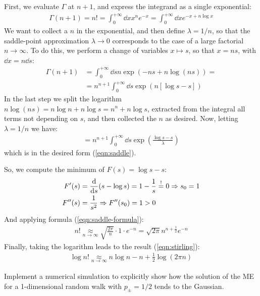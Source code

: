 \documentclass[../template.tex]{subfiles}
\begin{document}
\begin{exo}
    First, we evaluate $\Gamma$ at $n+1$, and express the integrand as a single exponential:
    \begin{align*}
        \Gamma(n+1) = n! = \int_0^{+\infty} \dd{x} x^n e^{-x}  = \int_{0}^{+\infty} \dd{x} e^{-x + n \log x} 
    \end{align*}
    We want to collect a $n$ in the exponential, and then define $\lambda = 1/n$, so that the saddle-point approximation $\lambda \to 0$ corresponds to the case of a large factorial $n \to \infty$. To do this, we perform a change of variables $x \mapsto s$, so that $x = n s$, with $\dd{x} = n \dd{s}$:
    \begin{align*}
        \Gamma(n+1) &= \int_0^{+\infty} \dd{s} n \exp(-ns + n \log(ns))= \\
        &= n^{n+1} \int_0^{+\infty} \dd{s} \exp(n[\log s - s])
    \end{align*}
    In the last step we split the logarithm $n\log(ns) = n\log n + n\log s = n^n + n\log s$, extracted from the integral all terms not depending on $s$, and then collected the $n$ as desired. Now, letting $\lambda = 1/n$ we have:
    \begin{align*}
        = n^{n+1} \int_0^{+\infty} \dd{s} \exp\left(\frac{\log s - s}{\lambda} \right)
    \end{align*}
    which is in the desired form (\ref{eqn:saddle}).

    So, we compute the minimum of $F(s) = \log s - s$:
    \begin{align*}
        F'(s) &= \dv{s} (s - \log s) = 1 - \frac{1}{s} \overset{!}{=} 0 \Rightarrow s_0 = 1\\
        F''(s) &= \frac{1}{s^2} \Rightarrow F''(s_0) = 1 > 0 
    \end{align*}
    And applying formula (\ref{eqn:saddle-formula}):
    \begin{align*}
        n! \underset{n \to \infty}{\approx} \sqrt{\frac{2\pi}{n} } \cdot 1 \cdot e^{-n} = \sqrt{2 \pi} n^{n+\frac{1}{2}} e^{-n}  
    \end{align*}
    Finally, taking the logarithm leads to the result (\ref{eqn:stirling}):
    \begin{align*}
        \log n! \underset{n \to \infty}{\approx} n \log n -n +\frac{1}{2} \log (2 \pi n) 
    \end{align*}
\end{exo}

\begin{exo}
    Implement a numerical simulation to explicitly show how the solution of the ME for a 1-dimensional random walk with $p_\pm = 1/2$ tends to the Gaussian. 
\end{exo}
\end{document}
